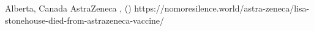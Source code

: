           {}
          {Alberta, Canada}
          {AstraZeneca}
          {}
          {,
            ()
          }
          {https://nomoresilence.world/astra-zeneca/lisa-stonehouse-died-from-astrazeneca-vaccine/}
